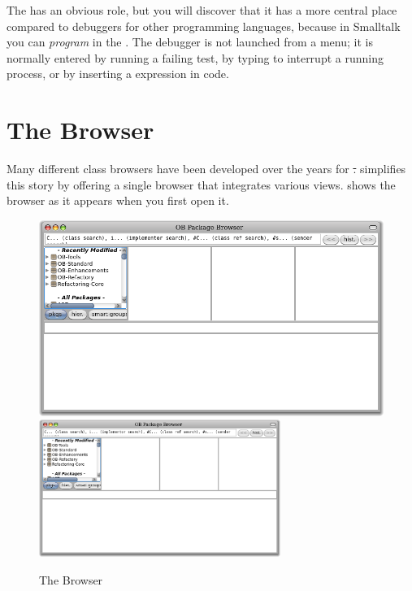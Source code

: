 \documentclass[a4paper,10pt,twoside]{book}
\begin{document}
The  has an obvious role, but you will discover that it has a more central place compared to debuggers for other programming languages, because in Smalltalk you can \emph{program} in the .  The debugger is not launched from a menu; it is normally entered by running a failing test, by typing  to interrupt a running process, or by inserting a  expression in code.

\section{The Browser}

Many different class browsers have been developed over the years for \st.
\pharo simplifies this story by offering a single browser that integrates various views.
 shows the browser as it appears when you first open it.

\begin{figure}[htbp]
   \centering
   \ifluluelse
	 {\includegraphics[width=\textwidth]{SystemBrowser0} }
	 {\includegraphics[width=0.7\textwidth]{SystemBrowser0} }
   \caption{The Browser}
\end{figure}
\end{document}
